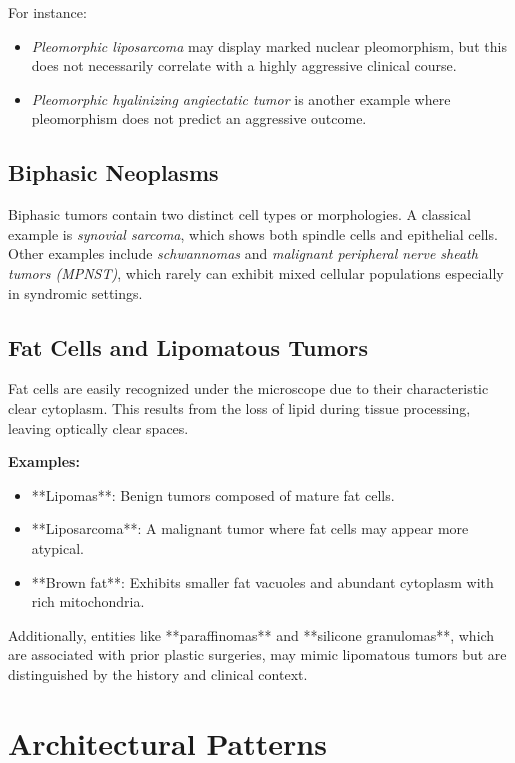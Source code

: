 For instance:
\begin{itemize}
    \item \emph{Pleomorphic liposarcoma} may display marked nuclear pleomorphism, but this does not necessarily correlate with a highly aggressive clinical course.
    \item \emph{Pleomorphic hyalinizing angiectatic tumor} is another example where pleomorphism does not predict an aggressive outcome.
\end{itemize}

\subsection{Biphasic Neoplasms}
Biphasic tumors contain two distinct cell types or morphologies. A classical example is \emph{synovial sarcoma}, which shows both spindle cells and epithelial cells. Other examples include \emph{schwannomas} and \emph{malignant peripheral nerve sheath tumors (MPNST)}, which rarely can exhibit mixed cellular populations especially in syndromic settings.

\subsection{Fat Cells and Lipomatous Tumors}
Fat cells are easily recognized under the microscope due to their characteristic clear cytoplasm. This results from the loss of lipid during tissue processing, leaving optically clear spaces.

\textbf{Examples:}
\begin{itemize}
    \item **Lipomas**: Benign tumors composed of mature fat cells.
    \item **Liposarcoma**: A malignant tumor where fat cells may appear more atypical.
    \item **Brown fat**: Exhibits smaller fat vacuoles and abundant cytoplasm with rich mitochondria.
\end{itemize}

Additionally, entities like **paraffinomas** and **silicone granulomas**, which are associated with prior plastic surgeries, may mimic lipomatous tumors but are distinguished by the history and clinical context.

\section{Architectural Patterns}

